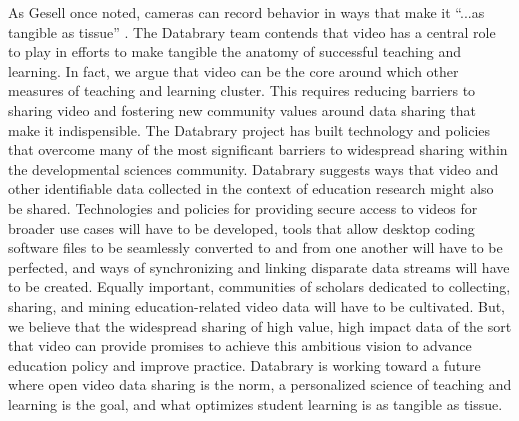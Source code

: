 \documentclass[letterpaper,man,apacite]{apa6}
\begin{document}
As Gesell once noted, cameras can record behavior in ways that make it “...as tangible as tissue” \cite{Scott2011}.
The Databrary team contends that video has a central role to play in efforts to make tangible the anatomy of successful teaching and learning. 
In fact, we argue that video can be the core around which other measures of teaching and learning cluster. 
This requires reducing barriers to sharing video and fostering new community values around data sharing that make it indispensible. 
The Databrary project has built technology and policies that overcome many of the most significant barriers to widespread sharing within the developmental sciences community. 
Databrary suggests ways that video and other identifiable data collected in the context of education research might also be shared. Technologies and policies for providing secure access to videos for broader use cases will have to be developed, tools that allow desktop coding software files to be seamlessly converted to and from one another will have to be perfected, and ways of synchronizing and linking disparate data streams will have to be created. 
Equally important, communities of scholars dedicated to collecting, sharing, and mining education-related video data will have to be cultivated. 
But, we believe that the widespread sharing of high value, high impact data of the sort that video can provide promises to achieve this ambitious vision to advance education policy and improve practice. 
Databrary is working toward a future where open video data sharing is the norm, a personalized science of teaching and learning is the goal, and what optimizes student learning is as tangible as tissue.


\end{document}
